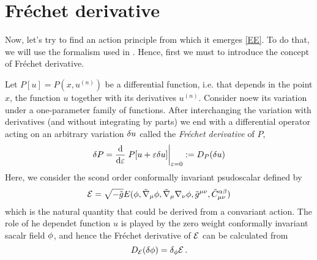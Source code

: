 \section{Fréchet derivative}
Now, let's try to find an action principle from which it emerges \eqref{EE}. To do that, we will use the formalism used in \cite{Ayon-Beato:2023bzp}. Hence, first we must to introduce the concept of Fréchet derivative.

Let $P[u]=P\left(x,u^{(n)}\right)$ be a differential function, i.e. that depends in the point $x$, the function $u$ together with its derivatives $u^{(n)}$. Consider noew its variation under a one-parameter family of functions. After interchanging the variation with derivatives (and without integrating by parts) we end with a differential operator acting on an arbitrary variation $\delta u$ called the \textit{Fréchet derivative} of $P$,
\begin{equation}
  \d P=\dv{\varepsilon}\eval{P[u+\varepsilon\d u]}_{\varepsilon=0}:=D_P(\d u)
\end{equation}
Here, we consider the scond order conformally invariant psudoscalar defined by
\begin{equation}\label{E-frechet}
  \mathcal{E}=\sqrt{-\tilde{g}}E(\phi,\tilde{\nabla}_\mu\phi ,\tilde{\nabla}_\mu\nabla_\nu \phi ,\tilde{g}^{\mu\nu },\tilde{C}_{\mu\nu }^{\alpha\beta })
\end{equation}
which is the natural quantity that could be derived from a convariant action. The role of he dependet function $u$ is played by the zero weight conformally invariant sacalr field $\phi$,  and hence the Fréchet derivative of $\mathcal{E}$ can be calculated from
\begin{equation}
  D_{\mathcal{E}}(\delta\phi )=\delta_\phi\mathcal{E}\, .
\end{equation}

